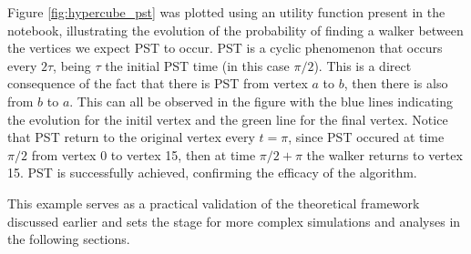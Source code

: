 \documentclass[main.tex]{subfiles}
\begin{document}
Figure \ref{fig:hypercube_pst} was plotted using an utility function present in
the notebook, illustrating the evolution of the probability of finding a walker
between the vertices we expect PST to occur. PST is a cyclic phenomenon that
occurs every $2\tau$, being $\tau$ the initial PST time (in this case $\pi/2$).
This is a direct consequence of the fact that there is PST from vertex $a$ to
$b$, then there is also from $b$ to $a$. This can all be observed in the figure
with the blue lines indicating the evolution for the initil vertex and the
green line for the final vertex. Notice that PST return to the original vertex
every $t=\pi$, since PST occured at time $\pi/2$ from vertex 0 to vertex 15,
then at time $\pi/2 + \pi$ the walker returns to vertex 15. PST is successfully
achieved, confirming the efficacy of the algorithm.

This example serves as a practical validation of the theoretical framework
discussed earlier and sets the stage for more complex simulations and analyses
in the following sections.
\end{document}
